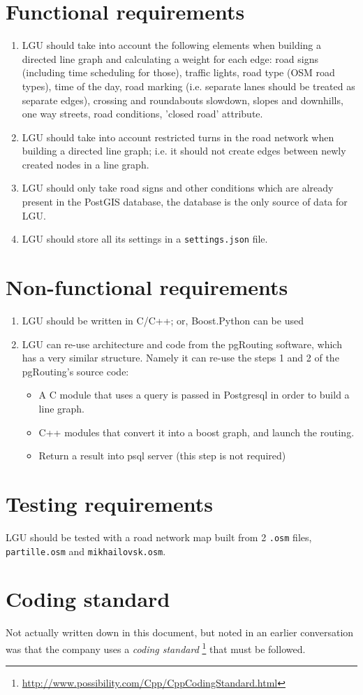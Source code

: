 \documentclass[../main.tex]{subfiles}
\begin{document}
\section{Functional requirements}
\begin{enumerate}[\thesection .1]
    \item LGU should take into account the following elements when building a directed line graph and calculating a weight for each edge: road signs (including time scheduling for those), traffic lights, road type (OSM road types), time of the day, road marking (i.e. separate lanes should be treated as separate edges), crossing and roundabouts slowdown, slopes and downhills, one way streets, road conditions, 'closed road' attribute.
    \item LGU should take into account restricted turns in the road network when building a directed line graph; i.e. it should not create edges between newly created nodes in a line graph.
    \item LGU should only take road signs and other conditions which are already present in the PostGIS database, the database is the only source of data for LGU.
    \item LGU should store all its settings in a \texttt{settings.json} file.
\end{enumerate}

\section{Non-functional requirements}
\begin{enumerate}[\thesection .1]
    \item LGU should be written in C/C++; or, Boost.Python can be used
    \item LGU can re-use architecture and code from the pgRouting software, which has a very similar structure. Namely it can re-use the steps 1 and 2 of the pgRouting's source code:
    \begin{itemize}
    \item A C module that uses a query is passed in Postgresql in order to build a line graph.
    \item C++ modules that convert it into a boost graph, and launch the routing.
    \item Return a result into psql server (this step is not required)
    \end{itemize}
\end{enumerate}

\section{Testing requirements}
LGU should be tested with a road network map built from 2 \texttt{.osm} files, \texttt{partille.osm} and \texttt{mikhailovsk.osm}.

\section{Coding standard}\label{sect:coding-standard}
Not actually written down in this document, but noted in an earlier conversation was that the company uses a \textit{coding standard} \footnote{\url{http://www.possibility.com/Cpp/CppCodingStandard.html}} that must be followed.
\end{document}
